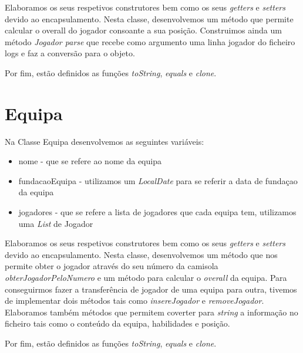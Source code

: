 \documentclass[a4paper,12pt]{article}
\begin{document}
    Elaboramos os seus respetivos construtores bem como os seus \emph{getters} e \emph{setters} devido ao encapsulamento.
Nesta classe, desenvolvemos um método que permite calcular o overall do jogador consoante a sua posição. Construimos
ainda um método \emph{ Jogador parse} que recebe como argumento uma linha jogador do ficheiro logs e faz a conversão para
o objeto.\par
    Por fim, estão definidos as funções \emph{toString}, \emph{equals} e \emph{clone}. \par

\section{Equipa}
    Na Classe Equipa desenvolvemos as seguintes variáveis:
    \begin{itemize}
        \item nome - que se refere ao nome da equipa
        \item fundacaoEquipa - utilizamos um \emph{LocalDate} para se referir a data de fundaçao da equipa
        \item jogadores - que se refere a lista de jogadores que cada equipa tem, utilizamos uma \emph{List} de Jogador
    \end{itemize}

    Elaboramos os seus respetivos construtores bem como os seus \emph{getters} e \emph{setters} devido ao encapsulamento.
Nesta classe, desenvolvemos um método que nos permite obter o jogador através do seu número da camisola
\emph{obterJogadorPeloNumero} e um método para calcular o \emph{overall} da equipa. Para conseguirmos fazer a
transferência de jogador de uma equipa para outra, tivemos de implementar dois métodos tais como \emph{insereJogador} e
\emph{removeJogador}. Elaboramos também métodos que permitem coverter para \emph{string} a informação no
    ficheiro tais como o conteúdo da equipa, habilidades e posição. \par
    Por fim, estão definidos as funções \emph{toString}, \emph{equals} e \emph{clone}. \par
\end{document}
